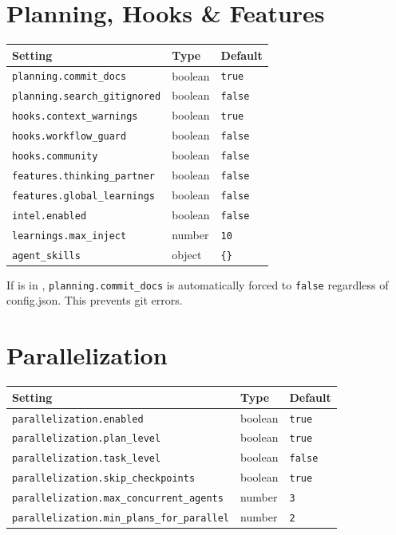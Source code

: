\documentclass[10pt,letterpaper]{article}
\begin{document}
\section{Planning, Hooks \& Features}

\begin{longtable}{@{}l l l@{}}
\toprule
\textbf{\footnotesize Setting} & \textbf{\footnotesize Type} & \textbf{\footnotesize Default} \\
\midrule
\endhead
\texttt{planning.commit\_docs} & boolean & \texttt{true} \\
\texttt{planning.search\_gitignored} & boolean & \texttt{false} \\
\texttt{hooks.context\_warnings} & boolean & \texttt{true} \\
\texttt{hooks.workflow\_guard} & boolean & \texttt{false} \\
\texttt{hooks.community} & boolean & \texttt{false} \\
\texttt{features.thinking\_partner} & boolean & \texttt{false} \\
\texttt{features.global\_learnings} & boolean & \texttt{false} \\
\texttt{intel.enabled} & boolean & \texttt{false} \\
\texttt{learnings.max\_inject} & number & \texttt{10} \\
\texttt{agent\_skills} & object & \texttt{\{\}} \\
\bottomrule
\end{longtable}

\begin{gsdnote}
If  is in , \texttt{planning.commit\_docs} is automatically forced to \texttt{false} regardless of config.json. This prevents git errors.
\end{gsdnote}

\section{Parallelization}

\begin{longtable}{@{}l l l@{}}
\toprule
\textbf{\footnotesize Setting} & \textbf{\footnotesize Type} & \textbf{\footnotesize Default} \\
\midrule
\endhead
\texttt{parallelization.enabled} & boolean & \texttt{true} \\
\texttt{parallelization.plan\_level} & boolean & \texttt{true} \\
\texttt{parallelization.task\_level} & boolean & \texttt{false} \\
\texttt{parallelization.skip\_checkpoints} & boolean & \texttt{true} \\
\texttt{parallelization.max\_concurrent\_agents} & number & \texttt{3} \\
\texttt{parallelization.min\_plans\_for\_parallel} & number & \texttt{2} \\
\bottomrule
\end{longtable}
\end{document}
